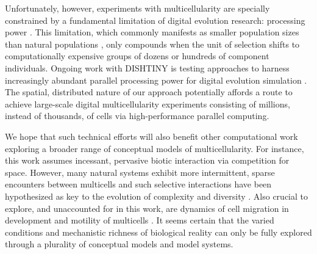 Unfortunately, however, experiments with multicellularity are specially constrained by a fundamental limitation of digital evolution research: processing power \citep{moreno2020profiling}.
This limitation, which commonly manifests as smaller population sizes than natural populations \citep{liard2018complexity}, only compounds when the unit of selection shifts to computationally expensive groups of dozens or hundreds of component individuals.
Ongoing work with DISHTINY is testing approaches to harness increasingly abundant parallel processing power for digital evolution simulation \citep{moreno2021conduit}.
The spatial, distributed nature of our approach potentially affords a route to achieve large-scale digital multicellularity experiments consisting of millions, instead of thousands, of cells via high-performance parallel computing.

We hope that such technical efforts will also benefit other computational work exploring a broader range of conceptual models of multicellularity.
For instance, this work assumes incessant, pervasive biotic interaction via competition for space.
However, many natural systems exhibit more intermittent, sparse encounters between multicells and such selective interactions have been hypothesized as key to the evolution of complexity and diversity \citep{soros2014identifying}.
Also crucial to explore, and unaccounted for in this work, are dynamics of cell migration in development \citep{horwitz2003cell} and motility of multicells \citep{arnellos2019bodily}.
It seems certain that the varied conditions and mechanistic richness of biological reality can only be fully explored through a plurality of conceptual models and model systems.
